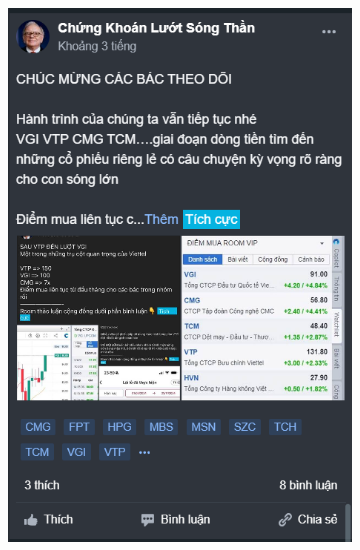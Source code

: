 \begin{figure}[H]
  \begin{subfigure}{.4\textwidth}
  \centering
    \includegraphics[width=1\linewidth]{images/fig-1.2.1-examplepost.png}
  \end{subfigure}%
  \begin{subfigure}{.55\textwidth}
  \centering

\end{subfigure}
\end{figure}
